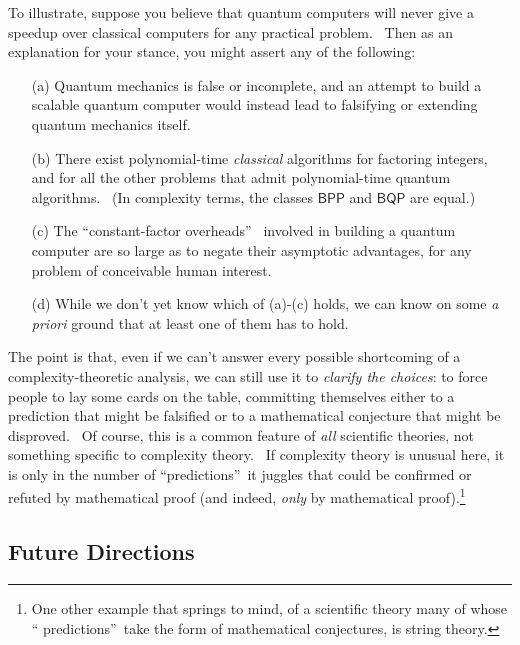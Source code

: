 \documentclass[12pt,onecolumn]{article}%
\begin{document}
To illustrate, suppose you believe that quantum computers will never give a
speedup over classical computers for any practical problem. \ Then as an
explanation for your stance, you might assert any of the following:

\begin{enumerate}
\item[(a)] Quantum mechanics is false or incomplete, and an attempt to build a
scalable quantum computer would instead lead to falsifying or extending
quantum mechanics itself.

\item[(b)] There exist polynomial-time \textit{classical} algorithms for
factoring integers, and for all the other problems that admit polynomial-time
quantum algorithms. \ (In complexity terms, the classes $\mathsf{BPP}$ and
$\mathsf{BQP}$ are equal.)

\item[(c)] The \textquotedblleft constant-factor overheads\textquotedblright%
\ involved in building a quantum computer are so large as to negate their
asymptotic advantages, for any problem of conceivable human interest.

\item[(d)] While we don't yet know which of (a)-(c) holds, we can know on some
\textit{a priori} ground that at least one of them has to hold.
\end{enumerate}

The point is that, even if we can't answer every possible shortcoming of a
complexity-theoretic analysis, we can still use it to \textit{clarify the
choices}: to force people to lay some cards on the table, committing
themselves either to a prediction that might be falsified or to a mathematical
conjecture that might be disproved. \ Of course, this is a common feature of
\textit{all} scientific theories, not something specific to complexity theory.
\ If complexity theory is unusual here, it is only in the number of
\textquotedblleft predictions\textquotedblright\ it juggles that could be
confirmed or refuted by mathematical proof (and indeed, \textit{only} by
mathematical proof).\footnote{One other example that springs to mind, of a
scientific theory many of whose \textquotedblleft
predictions\textquotedblright\ take the form of mathematical conjectures, is
string theory.}

\subsection{Future Directions\label{FUTURE}}
\end{document}
